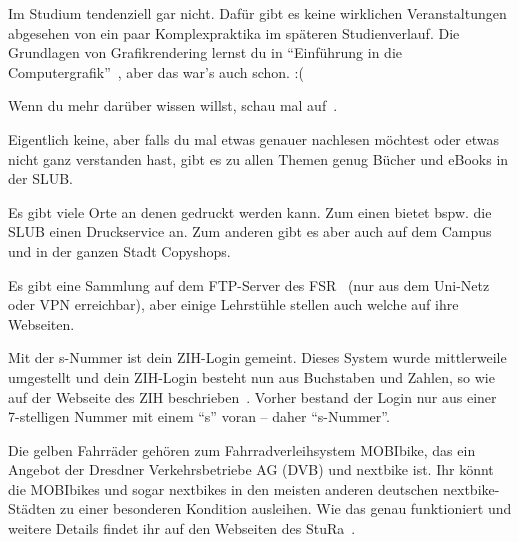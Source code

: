 Im Studium tendenziell gar nicht. Dafür gibt es keine wirklichen Veranstaltungen abgesehen von ein paar Komplexpraktika im späteren Studienverlauf. Die Grundlagen von Grafikrendering lernst du in \enquote{Einführung in die Computergrafik}~, aber das war's auch schon. :(

\label{minisec:faq}
Wenn du mehr darüber wissen willst, schau mal auf~.

Eigentlich keine, aber falls du mal etwas genauer nachlesen möchtest oder etwas nicht ganz verstanden hast, gibt es zu allen Themen genug Bücher und eBooks in der SLUB.~

Es gibt viele Orte an denen gedruckt werden kann. Zum einen bietet bspw. die SLUB einen Druckservice an. Zum anderen gibt es aber auch auf dem Campus und in der ganzen Stadt Copyshops.

Es gibt eine Sammlung auf dem FTP-Server des FSR~ (nur aus dem Uni-Netz oder VPN erreichbar), aber einige Lehrstühle stellen auch welche auf ihre Webseiten.

Mit der s-Nummer ist dein ZIH-Login gemeint. Dieses System wurde mittlerweile umgestellt und dein ZIH-Login besteht nun aus Buchstaben und Zahlen, so wie auf der Webseite des ZIH beschrieben~. Vorher bestand der Login nur aus einer 7-stelligen Nummer mit einem \enquote{s} voran -- daher \enquote{s-Nummer}.

Die gelben Fahrräder gehören zum Fahrradverleihsystem MOBIbike, das ein Angebot der Dresdner Verkehrsbetriebe AG (DVB) und nextbike ist. Ihr könnt die MOBIbikes und sogar nextbikes in den meisten anderen deutschen nextbike-Städten zu einer besonderen Kondition ausleihen. Wie das genau funktioniert und weitere Details findet ihr auf den Webseiten des StuRa~.

